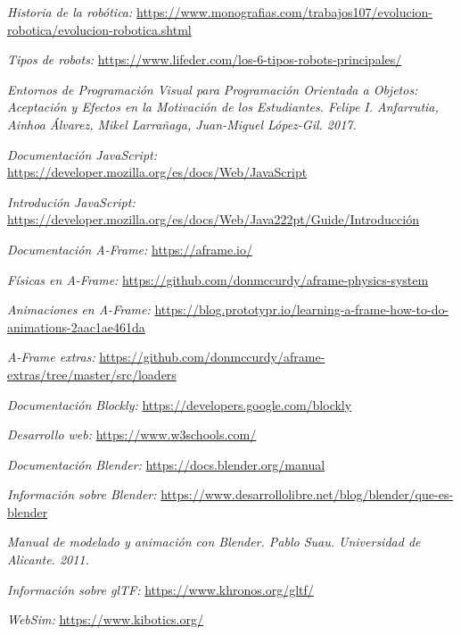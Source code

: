 \begin{thebibliography}{99}

    \textit{Historia de la robótica:}   \url{https://www.monografias.com/trabajos107/evolucion-robotica/evolucion-robotica.shtml}
    
    \textit{Tipos de robots:}   \url{https://www.lifeder.com/los-6-tipos-robots-principales/}
    
    \textit{Entornos de Programación Visual para Programación Orientada a Objetos: Aceptación y Efectos en la Motivación de los Estudiantes. Felipe I. Anfarrutia, Ainhoa Álvarez, Mikel Larrañaga, Juan-Miguel López-Gil. 2017.}
    
    \textit{Documentación JavaScript: }
    \url{https://developer.mozilla.org/es/docs/Web/JavaScript}
    
    
    \textit{Introdución JavaScript: }
    \url{https://developer.mozilla.org/es/docs/Web/Java222pt/Guide/Introducción}
   
    \textit{Documentación A-Frame:}
    \url{https://aframe.io/}
    
    \textit{Físicas en A-Frame: }
    \url{https://github.com/donmccurdy/aframe-physics-system}
    
    \textit{Animaciones en A-Frame: }
    \url{https://blog.prototypr.io/learning-a-frame-how-to-do-animations-2aac1ae461da}
    
    \textit{A-Frame extras: }
    \url{https://github.com/donmccurdy/aframe-extras/tree/master/src/loaders}
    
    \textit{Documentación Blockly: }
    \url{https://developers.google.com/blockly}
    
    \textit{Desarrollo web: }
    \url{https://www.w3schools.com/}
    
    \textit{Documentación Blender: }
    \url{https://docs.blender.org/manual}
    
    \textit{Información sobre Blender: }
    \url{https://www.desarrollolibre.net/blog/blender/que-es-blender}
    
    \textit{Manual de modelado y animación con Blender. Pablo Suau. Universidad de Alicante. 2011.}
    
    \textit{Información sobre glTF: }
    \url{https://www.khronos.org/gltf/}
   
    \textit{WebSim:}   \url{https://www.kibotics.org/}
\end{thebibliography}